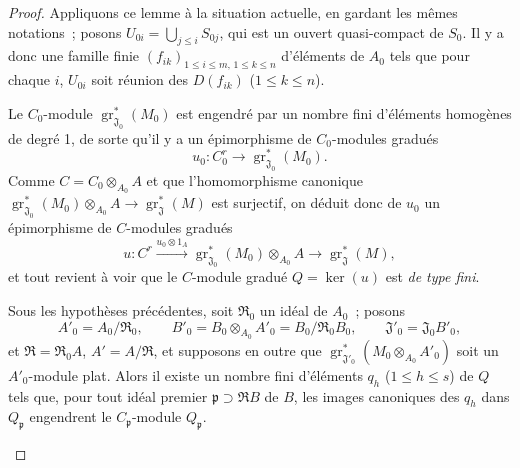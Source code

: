 \begin{proof}
Appliquons ce lemme à la situation actuelle, en gardant les mêmes notations~;
posons $U_{0i}=\bigcup_{j\leq i}S_{0j}$, qui est un ouvert quasi-compact de
$S_0$. Il y a donc une famille
finie $(f_{ik})_{1\leq i\leq m,\,1\leq k\leq n}$ d'éléments de $A_0$ tels que pour
chaque $i$, $U_{0i}$ soit réunion des $D(f_{ik})$ ($1\leq k\leq n$).


Le $C_0$-module $\operatorname{gr}_{\mathfrak J_0}^*(M_0)$ est engendré par
un nombre fini d'éléments homogènes de degré 1, de sorte qu'il y a un
épimorphisme de $C_0$-modules gradués
\[
u_0:C_0^r\longrightarrow\operatorname{gr}_{\mathfrak J_0}^*(M_0).
\]
Comme $C=C_0\otimes_{A_0}A$ et que l'homomorphisme canonique
$\operatorname{gr}_{\mathfrak J_0}^*(M_0)\otimes_{A_0}A
\to\operatorname{gr}_{\mathfrak J}^*(M)$ est surjectif, on déduit donc de
$u_0$ un épimorphisme de $C$-modules gradués
\[
u:C^r\xrightarrow{u_0\otimes1_A}
\operatorname{gr}_{\mathfrak J_0}^*(M_0)\otimes_{A_0}A
\longrightarrow\operatorname{gr}_{\mathfrak J}^*(M),
\]
et tout revient à voir que le $C$-module gradué $Q=\ker(u)$ est \emph{de type
fini}.

\begin{lemma}[11.2.9.6]
\label{IV.11.2.9.6-fr}
Sous les hypothèses précédentes, soit $\mathfrak R_0$ un idéal de $A_0$~;
posons
\[
A'_0=A_0/\mathfrak R_0,\qquad
B'_0=B_0\otimes_{A_0}A'_0=B_0/\mathfrak R_0B_0,\qquad
\mathfrak J'_0=\mathfrak J_0B'_0,
\]
et $\mathfrak R=\mathfrak R_0A$, $A'=A/\mathfrak R$, et supposons en outre
que $\operatorname{gr}_{\mathfrak J'_0}^*(M_0\otimes_{A_0}A'_0)$ soit un
$A'_0$-module plat. Alors il existe un nombre fini d'éléments $q_h$
($1\leq h\leq s$) de $Q$ tels que, pour tout idéal premier
$\mathfrak p\supset\mathfrak RB$ de $B$, les images canoniques des $q_h$ dans
$Q_\mathfrak p$ engendrent le $C_\mathfrak p$-module $Q_\mathfrak p$.
\end{lemma}


\end{proof}
